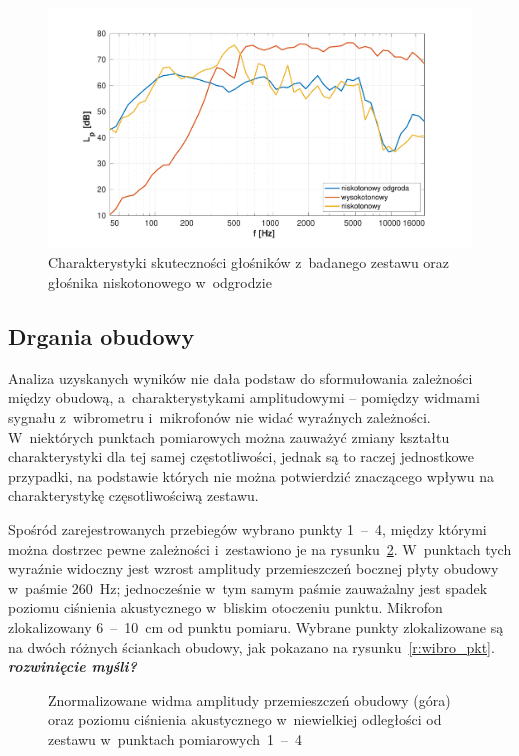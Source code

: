 \documentclass[12pt]{oska}
\newcommand{\range}[2]{\num{#1}~--~\num{#2}}
\newcommand{\comment}[1]{{\color{magenta}\emph{\textbf{#1}}}}
\begin{document}
		\begin{figure}[H]
			\centering
			\includegraphics[width=.8\textwidth,trim={2cm .5cm 2cm 1cm},clip]{skutecznosci_stolik.pdf}
			\caption{Charakterystyki skuteczności głośników z~badanego zestawu oraz głośnika niskotonowego w~odgrodzie}
			\label{r:skutecznosc}
		\end{figure}
		
	
	\subsection{Drgania obudowy}
		
		Analiza uzyskanych wyników nie dała podstaw do sformułowania zależności między obudową, a~charakterystykami amplitudowymi -- pomiędzy widmami sygnału z~wibrometru i~mikrofonów nie widać wyraźnych zależności. W~niektórych punktach pomiarowych można zauważyć zmiany kształtu charakterystyki dla tej samej częstotliwości, jednak są to raczej jednostkowe przypadki, na podstawie których nie można potwierdzić znaczącego wpływu na charakterystykę częsotliwościwą zestawu.
		
		Spośród zarejestrowanych przebiegów wybrano punkty \range{1}{4}, między którymi można dostrzec pewne zależności i~zestawiono je na rysunku~\ref{r:wibrometr_1-4}. W~punktach tych wyraźnie widoczny jest wzrost amplitudy przemieszczeń bocznej płyty obudowy w~paśmie \SI{260}{\hertz}; jednocześnie w~tym samym paśmie zauważalny jest spadek poziomu ciśnienia akustycznego w~bliskim otoczeniu punktu. Mikrofon zlokalizowany \range{6}{10}~\si{\cm} od punktu pomiaru. Wybrane punkty zlokalizowane są na dwóch różnych ściankach obudowy, jak pokazano na rysunku~\ref{r:wibro_pkt}.  \comment{rozwinięcie myśli?}
		
		\begin{figure}[H]
			\centering
			\caption{Znormalizowane widma amplitudy przemieszczeń obudowy (góra) oraz poziomu ciśnienia akustycznego w~niewielkiej odległości od zestawu w~punktach pomiarowych~\range{1}{4}}
			\label{r:wibrometr_1-4}
		\end{figure}
		
\end{document}

